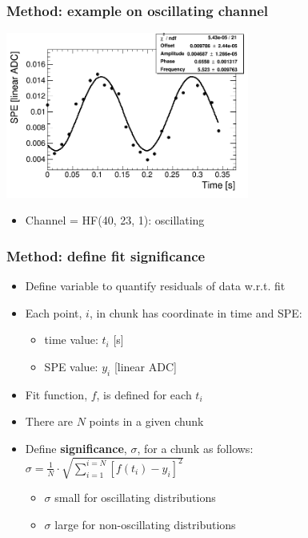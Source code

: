 \documentclass[bigger]{beamer}
\providecommand{\alert}[1]{\textbf{#1}}
\begin{document}
\begin{frame}
\frametitle{Method: example on oscillating channel}
\label{sec-2-1-4}
\label{sec-2-1-4-1}

\centering
\includegraphics[width=0.6\textwidth]{fig/fit_output_ieta40_iphi23_depth1.png}
\begin{itemize}

\item Channel = HF(40, 23, 1): oscillating
\label{sec-2-1-4-2}%
\end{itemize} %
\end{frame}
\begin{frame}
\frametitle{Method: define fit significance}
\label{sec-2-1-5}
\begin{itemize}

\item Define variable to quantify residuals of data w.r.t. fit
\label{sec-2-1-5-1}%

\item Each point, $i$, in chunk has coordinate in time and SPE:
\label{sec-2-1-5-2}%
\begin{itemize}

\item time value: $t_i$ [s]
\label{sec-2-1-5-2-1}%

\item SPE value: $y_i$ [linear ADC]
\label{sec-2-1-5-2-2}%
\end{itemize} %

\item Fit function, $f$, is defined for each $t_i$
\label{sec-2-1-5-3}%

\item There are $N$ points in a given chunk
\label{sec-2-1-5-4}%

\item Define \alert{significance}, $\sigma$, for a chunk as follows:\\
\label{sec-2-1-5-5}%
\(\sigma = \frac{1}{N}\cdot\sqrt{\sum_{i=1}^{i=N}\left[f(t_{i}) - y_{i}\right]^{2}} \)
\begin{itemize}

\item $\sigma$ small for oscillating distributions
\label{sec-2-1-5-5-1}%

\item $\sigma$ large for non-oscillating distributions
\label{sec-2-1-5-5-2}%
\end{itemize} %
\end{itemize} %
\end{frame}
\end{document}
